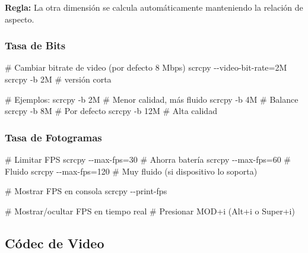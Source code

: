 \documentclass[
  doc,
  floatsintext,
  longtable,
  a4paper,
  nolmodern,
  notxfonts,
  notimes,
  12pt,
  colorlinks=true,linkcolor=blue,citecolor=blue,urlcolor=blue]{apa7}
\newenvironment{Shaded}{\begin{snugshade}}{\end{snugshade}}
\newcommand{\AttributeTok}[1]{\textcolor[rgb]{0.40,0.45,0.13}{#1}}
\newcommand{\CommentTok}[1]{\textcolor[rgb]{0.37,0.37,0.37}{#1}}
\newcommand{\ExtensionTok}[1]{\textcolor[rgb]{0.00,0.23,0.31}{#1}}
\newcommand{\NormalTok}[1]{\textcolor[rgb]{0.00,0.23,0.31}{#1}}
\newcommand{\OperatorTok}[1]{\textcolor[rgb]{0.37,0.37,0.37}{#1}}
\begin{document}
\textbf{Regla:} La otra dimensión se calcula automáticamente manteniendo
la relación de aspecto.

\subsubsection{Tasa de Bits}\label{tasa-de-bits}

\begin{Shaded}
\begin{Highlighting}[]
\CommentTok{\# Cambiar bitrate de video (por defecto 8 Mbps)}
\ExtensionTok{scrcpy} \AttributeTok{{-}{-}video{-}bit{-}rate}\OperatorTok{=}\NormalTok{2M}
\ExtensionTok{scrcpy} \AttributeTok{{-}b}\NormalTok{ 2M  }\CommentTok{\# versión corta}

\CommentTok{\# Ejemplos:}
\ExtensionTok{scrcpy} \AttributeTok{{-}b}\NormalTok{ 2M   }\CommentTok{\# Menor calidad, más fluido}
\ExtensionTok{scrcpy} \AttributeTok{{-}b}\NormalTok{ 4M   }\CommentTok{\# Balance}
\ExtensionTok{scrcpy} \AttributeTok{{-}b}\NormalTok{ 8M   }\CommentTok{\# Por defecto}
\ExtensionTok{scrcpy} \AttributeTok{{-}b}\NormalTok{ 12M  }\CommentTok{\# Alta calidad}
\end{Highlighting}
\end{Shaded}

\subsubsection{Tasa de Fotogramas}\label{tasa-de-fotogramas}

\begin{Shaded}
\begin{Highlighting}[]
\CommentTok{\# Limitar FPS}
\ExtensionTok{scrcpy} \AttributeTok{{-}{-}max{-}fps}\OperatorTok{=}\NormalTok{30   }\CommentTok{\# Ahorra batería}
\ExtensionTok{scrcpy} \AttributeTok{{-}{-}max{-}fps}\OperatorTok{=}\NormalTok{60   }\CommentTok{\# Fluido}
\ExtensionTok{scrcpy} \AttributeTok{{-}{-}max{-}fps}\OperatorTok{=}\NormalTok{120  }\CommentTok{\# Muy fluido (si dispositivo lo soporta)}

\CommentTok{\# Mostrar FPS en consola}
\ExtensionTok{scrcpy} \AttributeTok{{-}{-}print{-}fps}

\CommentTok{\# Mostrar/ocultar FPS en tiempo real}
\CommentTok{\# Presionar MOD+i (Alt+i o Super+i)}
\end{Highlighting}
\end{Shaded}

\subsection{Códec de Video}\label{cuxf3dec-de-video}
\end{document}

